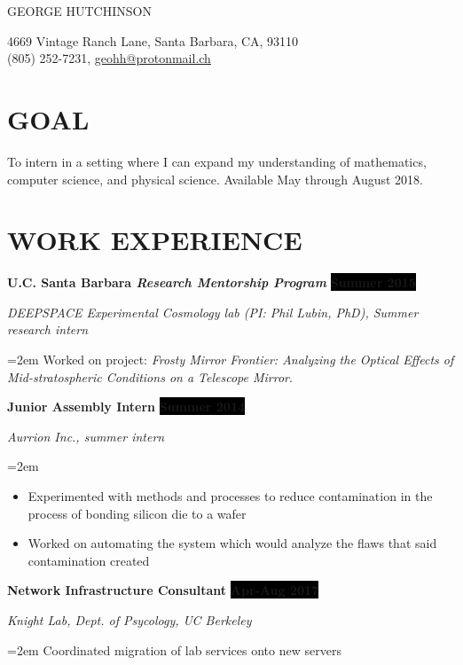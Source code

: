 \documentclass[paper=a4,fontsize=11pt]{scrartcl} %
\newlength{\spacebox}
\newcommand{\sepspace}{\vspace*{0.5em}}		%
\newcommand{\MyName}[1]{ %
		\Huge \usefont{OT1}{phv}{b}{n} \hfill #1
		\par \normalsize \normalfont}
\newcommand{\MyContact}[1]{ %
		\large \usefont{OT1}{phv}{m}{n}\hfill #1
		\par \normalsize \normalfont}
\newcommand{\NewPart}[1]{\section*{\uppercase{#1}}}
\newcommand{\PersonalEntry}[2]{
		\noindent\hangindent=2em\hangafter=0 %
		\parbox{\spacebox}{        %
		\textit{#1}}		       %
		\hspace{1.5em} #2 \par}    %
\newcommand{\EducationEntry}[4]{
		\noindent \textbf{#1} \hfill      %
		\colorbox{Black}{%
			\parbox{6.5em}{%
			\hfill\color{White}\textbf{#2}}} \par  %
		\noindent \textit{#3} \par        %
		\noindent\hangindent=2em\hangafter=0 \small #4 %
		\normalsize \par}
\newcommand{\WorkEntry}[4]{				  %
		\noindent \textbf{#1} \hfill      %
		\colorbox{Black}{\color{White}\textbf{#2}} \par  %
		\noindent \textit{#3} \par              %
		\noindent\hangindent=2em\hangafter=0 \small #4 %
		\normalsize \par}
\begin{document}

\MyName{GEORGE HUTCHINSON}
\MyContact{4669 Vintage Ranch Lane, Santa Barbara, CA, 93110\\\hspace*{\fill}(805) 252-7231, \url{geohh@protonmail.ch}}
\vspace*{-2em}

%

\label{GOAL}
\NewPart{Goal}

To intern in a setting where I can expand my understanding of mathematics, computer science, and physical science.
Available May through August 2018.

\label{WORK}

\NewPart{Work experience}{}

\WorkEntry{U.C. Santa Barbara \textit{Research Mentorship Program}}{Summer 2015}{DEEPSPACE Experimental Cosmology lab (PI: Phil Lubin, PhD), Summer research intern}{Worked on project: \textit{Frosty Mirror Frontier: Analyzing the Optical Effects of Mid-stratospheric Conditions on a Telescope Mirror}.}
\sepspace

\WorkEntry{Junior Assembly Intern}{Summer 2014}{Aurrion Inc., summer intern}{\begin{itemize}\setlength\itemsep{0em}
		\item Experimented with methods and processes to reduce contamination in the process of bonding silicon die to a wafer
		\item Worked on automating the system which would analyze the flaws that said contamination created	\end{itemize} }
	
\WorkEntry{Network Infrastructure Consultant}{Apr-Aug 2017}{Knight Lab, Dept. of Psycology, UC Berkeley}{Coordinated migration of lab services onto new servers}
\end{document}
